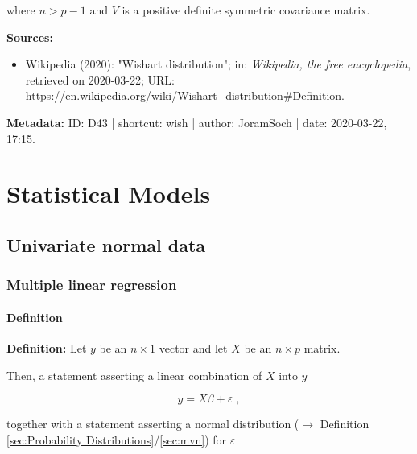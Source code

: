 \documentclass[a4paper,12pt,twoside]{book}
\begin{document}
where $n > p - 1$ and $V$ is a positive definite symmetric covariance matrix.


\vspace{1em}
\textbf{Sources:}
\begin{itemize}
\item Wikipedia (2020): "Wishart distribution"; in: \textit{Wikipedia, the free encyclopedia}, retrieved on 2020-03-22; URL: \url{https://en.wikipedia.org/wiki/Wishart_distribution#Definition}.
\end{itemize}


\vspace{1em}
\textbf{Metadata:} ID: D43 | shortcut: wish | author: JoramSoch | date: 2020-03-22, 17:15.
\vspace{1em}





\chapter{Statistical Models} \label{sec:Statistical Models} \newpage

\pagebreak
\section{Univariate normal data}

\subsection{Multiple linear regression}

\subsubsection[\textit{Definition}]{Definition} \label{sec:mlr}
\setcounter{equation}{0}

\textbf{Definition:} Let $y$ be an $n \times 1$ vector and let $X$ be an $n \times p$ matrix.

Then, a statement asserting a linear combination of $X$ into $y$

\begin{equation} \label{eq:mlr-mlr-model}
y = X\beta + \varepsilon \; ,
\end{equation}

together with a statement asserting a normal distribution ($\rightarrow$ Definition \ref{sec:Probability Distributions}/\ref{sec:mvn}) for $\varepsilon$
\end{document}
